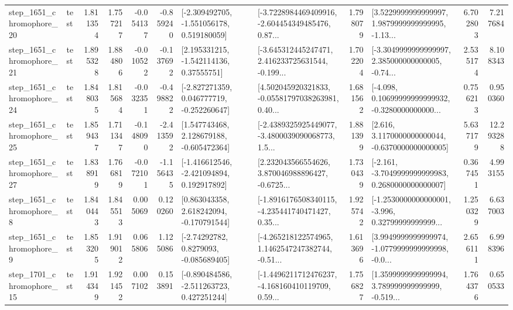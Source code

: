 \begin{tabular}{llrrrrllrlrr}
 step\_1651\_chromophore\_20 &      test &      1.811354 &    1.757217 &     -0.054137 & -0.859240 &   [-2.309492705, -1.551056178, 0.519180059] &  [-3.7228984469409916, -2.604454349485476, 0.87... &       1.798079 &  [3.5229999999999997, 1.9879999999999995, -1.13... &            6.702803 &          7.217684 \\
 step\_1651\_chromophore\_21 &      test &      1.895328 &    1.884806 &     -0.010522 & -0.137692 &     [2.195331215, -1.542114136, 0.37555751] &  [-3.645312445247471, 2.416233725631544, -0.199... &       1.702204 &  [-3.3049999999999997, 2.385000000000005, -0.74... &            2.535174 &          8.108343 \\
 step\_1651\_chromophore\_24 &      test &      1.848035 &    1.815684 &     -0.032351 & -0.498822 &   [-2.827271359, 0.046777719, -0.252260647] &  [4.502045920321833, -0.05581797038263981, 0.40... &       1.681562 &  [-4.098, 0.10699999999999932, -0.3280000000000... &            0.756213 &          0.950360 \\
 step\_1651\_chromophore\_25 &      test &      1.859437 &    1.711347 &     -0.148090 & -2.413592 &    [1.547743468, 2.128679188, -0.605472364] &  [-2.4389325925449077, -3.4800039090068773, 1.5... &       1.881399 &   [2.616, 3.1170000000000044, -0.6370000000000005] &            5.637179 &         12.293288 \\
 step\_1651\_chromophore\_27 &      test &      1.838919 &    1.766819 &     -0.072101 & -1.156435 &   [-1.416612546, -2.421094894, 0.192917892] &  [2.232043566554626, 3.870046988896427, -0.6725... &       1.730439 &  [-2.161, -3.7049999999999983, 0.2680000000000007] &            0.367451 &          4.993155 \\
  step\_1651\_chromophore\_8 &      test &      1.840443 &    1.845513 &      0.005069 &  0.120260 &    [0.863043358, 2.618242094, -0.170791544] &  [-1.8916176508340115, -4.235441740471427, 0.35... &       1.925742 &  [-1.2530000000000001, -3.996, 0.32799999999999... &            1.250329 &          6.637003 \\
  step\_1651\_chromophore\_9 &      test &      1.853205 &    1.919012 &      0.065806 &  1.125086 &      [-2.74292782, 0.8279093, -0.085689405] &  [-4.265218122574965, 1.1462547247382744, -0.51... &       1.613696 &  [3.9949999999999974, -1.0779999999999998, -0.0... &            2.656111 &          6.998396 \\
 step\_1701\_chromophore\_15 &      test &      1.914349 &    1.921452 &      0.007102 &  0.153891 &   [-0.890484586, -2.511263723, 0.427251244] &  [-1.4496211712476237, -4.168160410119709, 0.59... &       1.756827 &  [1.3599999999999994, 3.789999999999999, -0.519... &            1.764376 &          0.650533 \\

\end{tabular}

